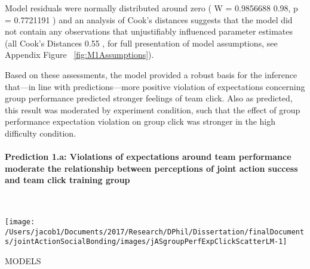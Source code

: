 \documentclass[english]{article}\usepackage[]{graphicx}\usepackage[]{color}
\makeatletter
\def\maxwidth{ %
  \ifdim\Gin@nat@width>\linewidth
    \linewidth
  \else
    \Gin@nat@width
  \fi
}
\newenvironment{kframe}{%
 \def\at@end@of@kframe{}%
 \ifinner\ifhmode%
  \def\at@end@of@kframe{\end{minipage}}%
  \begin{minipage}{\columnwidth}%
 \fi\fi%
 \def\FrameCommand##1{\hskip\@totalleftmargin \hskip-\fboxsep
 \colorbox{shadecolor}{##1}\hskip-\fboxsep
     \hskip-\linewidth \hskip-\@totalleftmargin \hskip\columnwidth}%
 \MakeFramed {\advance\hsize-\width
   \@totalleftmargin\z@ \linewidth\hsize
   \@setminipage}}%
 {\par\unskip\endMakeFramed%
 \at@end@of@kframe}
\newenvironment{knitrout}{}{} %
\newcommand{\myparagraph}[1]{\paragraph{#1}\mbox{}\\}
\newcommand{\pvalue}{p =}
\newcommand{\resdist}{W = }
\newcommand{\cooksD}{Cook's Distances}
\makeatother
\begin{document}
 Model residuals were normally distributed around zero
(
  \resdist
    0.9856688 0.98,
  \pvalue
    0.7721191
)
and an analysis of Cook's distances suggests that the model did not contain any observations that unjustifiably influenced parameter estimates
(all
  \cooksD
    0.55
  ,
  for full presentation of model assumptions, see Appendix Figure ~\ref{fig:M1Assumptions}).

Based on these assessments, the model provided a robust basis for the inference that---in line with predictions---more positive violation of expectations concerning group performance predicted stronger feelings of team click. Also as predicted, this result was moderated by experiment condition, such that the effect of group performance expectation violation on group click was stronger in the high difficulty condition.





\myparagraph{Prediction 1.a: Violations of expectations around team performance moderate the relationship between perceptions of joint action success and team click training group}

\begin{knitrout}
\color{fgcolor}\begin{kframe}


{\ttfamily\noindent\color{warningcolor}{\#\# Warning: Removed 1 rows containing missing values (geom\_point).}}\end{kframe}

{\centering \texttt{[image: /Users/jacob1/Documents/2017/Research/DPhil/Dissertation/finalDocuments/jointActionSocialBonding/images/jASgroupPerfExpClickScatterLM-1]} 

}


\begin{kframe}

{\ttfamily\noindent\itshape\color{messagecolor}{\#\# Saving 3.5 x 3.5 in image}}

{\ttfamily\noindent\color{warningcolor}{\#\# Warning: Removed 1 rows containing missing values (geom\_point).}}\end{kframe}
\end{knitrout}



MODELS
\end{document}
